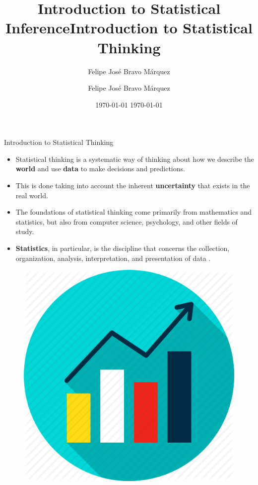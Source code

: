 \documentclass[handout]{beamer}
\title{Introduction to Statistical Inference}
\author[Felipe Bravo Márquez]{\footnotesize
 \textcolor[rgb]{0.00,0.00,1.00}{Felipe José Bravo Márquez}}
\date{ \today }
\title{Introduction to Statistical Thinking}
\author[Felipe Bravo Márquez]{\footnotesize
 \textcolor[rgb]{0.00,0.00,1.00}{Felipe José Bravo Márquez}}
\date{ \today }
\begin{document}
\begin{frame}
\titlepage


\end{frame}




\begin{frame}{Introduction to Statistical Thinking}
\scriptsize{
\begin{itemize}
\item Statistical thinking is a systematic way of thinking about how we describe the \textbf{world} and use \textbf{data} to make decisions and predictions.

\item This is done taking into account the inherent \textbf{uncertainty} that exists in the real world.  \cite{poldrack2019statistical}

 
 \item The foundations of statistical thinking come primarily from mathematics and statistics, but also from computer science, psychology, and other fields of study. \cite{poldrack2019statistical}
 
 \item \textbf{Statistics}, in particular, is the discipline that concerns the collection, organization, analysis, interpretation, and presentation of data \cite{wiki:Statistics}.
 
\end{itemize}

\begin{figure}[h!]
	\centering
	\includegraphics[scale=0.2]{pics/stats.png}
\end{figure}

} 
\end{frame}
\end{document}
